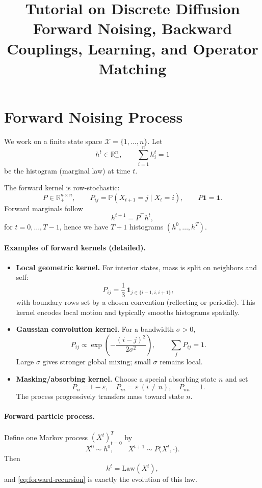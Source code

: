 \documentclass[11pt]{article}
\title{Tutorial on Discrete Diffusion\\[0.3em]\large Forward Noising, Backward Couplings, Learning, and Operator Matching}
\author{}
\date{}
\newcommand{\ones}{\mathbf{1}}
\begin{document}
\maketitle

\section{Forward Noising Process}
We work on a finite state space $\mathcal{X}=\{1,\dots,n\}$. Let
\[
h^t\in\mathbb{R}_+^n,\qquad \sum_{i=1}^n h_i^t=1
\]
be the histogram (marginal law) at time $t$.

The forward kernel is row-stochastic:
\[
P\in\mathbb{R}_+^{n\times n},\qquad P_{ij}=\mathbb{P}(X_{t+1}=j\mid X_t=i),\qquad P\ones=\ones.
\]
Forward marginals follow
\begin{equation}
\label{eq:forward-recursion}
h^{t+1}=P^\top h^t,
\end{equation}
for $t=0,\dots,T-1$, hence we have $T+1$ histograms $(h^0,\dots,h^T)$.

\paragraph{Examples of forward kernels (detailed).}
\begin{itemize}
\item \textbf{Local geometric kernel.}
For interior states, mass is split on neighbors and self:
\[
P_{ij}=\frac13\,\mathbf{1}_{j\in\{i-1,i,i+1\}},
\]
with boundary rows set by a chosen convention (reflecting or periodic).
This kernel encodes local motion and typically smooths histograms spatially.

\item \textbf{Gaussian convolution kernel.}
For a bandwidth $\sigma>0$,
\[
P_{ij}\propto \exp\!\left(-\frac{(i-j)^2}{2\sigma^2}\right),
\qquad
\sum_j P_{ij}=1.
\]
Large $\sigma$ gives stronger global mixing; small $\sigma$ remains local.

\item \textbf{Masking/absorbing kernel.}
Choose a special absorbing state $n$ and set
\[
P_{ii}=1-\varepsilon,\quad P_{in}=\varepsilon\ (i\neq n),\quad P_{nn}=1.
\]
The process progressively transfers mass toward state $n$.
\end{itemize}

\paragraph{Forward particle process.}
Define one Markov process $(X^t)_{t=0}^T$ by
\[
X^0\sim h^0,
\qquad
X^{t+1}\sim P\big(X^t,\cdot\big).
\]
Then
\[
h^t=\mathrm{Law}(X^t),
\]
and \eqref{eq:forward-recursion} is exactly the evolution of this law.
\end{document}
